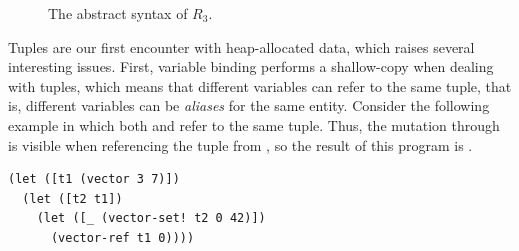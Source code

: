 \documentclass[11pt]{book}
\newcommand{\gray}[1]{{\color{gray} #1}}
\begin{document}
\begin{figure}[tp]
\centering
\fbox{
\begin{minipage}{0.96\textwidth}
\[
\begin{array}{lcl}
\Exp &::=& \gray{ \INT{\Int} \mid \READ{} \mid \NEG{\Exp} } \\
     &\mid& \gray{ \ADD{\Exp}{\Exp} 
      \mid \BINOP{\code{'-}}{\Exp}{\Exp} } \\
     &\mid& \gray{ \VAR{\Var} \mid \LET{\Var}{\Exp}{\Exp} } \\
     &\mid& \gray{ \BOOL{\itm{bool}} 
      \mid \AND{\Exp}{\Exp} }\\
     &\mid& \gray{ \OR{\Exp}{\Exp}
      \mid \NOT{\Exp} } \\
     &\mid& \gray{ \BINOP{\itm{cmp}}{\Exp}{\Exp}
      \mid \IF{\Exp}{\Exp}{\Exp} } \\
     &\mid& \VECTOR{\Exp} \\
     &\mid& \VECREF{\Exp}{\INT{\Int}}\\
     &\mid& \VECSET{\Exp}{\INT{\Int}}{\Exp}\\
      &\mid& \VOID{} \mid \LP\key{HasType}~\Exp~\Type \RP \\
  R_3 &::=& \PROGRAM{\key{'()}}{\Exp}
\end{array}
\]
\end{minipage}
}
\caption{The abstract syntax of $R_3$.}
\label{fig:r3-syntax}
\end{figure}

Tuples are our first encounter with heap-allocated data, which raises
several interesting issues. First, variable binding performs a
shallow-copy when dealing with tuples, which means that different
variables can refer to the same tuple, that is, different variables
can be \emph{aliases} for the same entity. Consider the following
example in which both  and  refer to the same tuple.
Thus, the mutation through  is visible when referencing the
tuple from , so the result of this program is .
\begin{center}
\begin{minipage}{0.96\textwidth}
\begin{lstlisting}
(let ([t1 (vector 3 7)])
  (let ([t2 t1])
    (let ([_ (vector-set! t2 0 42)])
      (vector-ref t1 0))))
\end{lstlisting}
\end{minipage}
\end{center}
\end{document}
